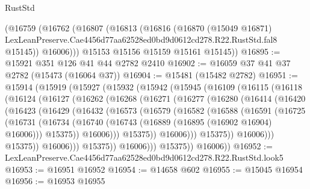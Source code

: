 \begin{lexlean}{RustStd}
\begin{coremodule}
      (@16759
        (@16762
          (@16807
            (@16813
              (@16816
                (@16870
                  (@15049 @16871)
                  LexLeanPreserve.Cae4456d77aa62528ed0bd9d0612cd278.R22.RustStd.fal8
                  @15145))
              @16006)))
        @15153
        @15156
        @15159
        @15161
        @15145))
@16895 := @15921 @351 @126 @41 @44 @2782 @2410
@16902 := @16059 @37 @41 @37 @2782 (@15473 (@16064 @37))
@16904 := @15481 (@15482 @2782)
@16951 := @15914
    (@15919
      (@15927
        (@15932
          (@15942
            (@15945
              (@16109
                (@16115
                  (@16118
                    (@16124
                      (@16127
                        (@16262
                          (@16268
                            (@16271
                              (@16277
                                (@16280
                                  (@16414
                                    (@16420
                                      (@16423
                                        (@16429
                                          (@16432
                                            (@16573
                                              (@16579
                                                (@16582
                                                  (@16588
                                                    (@16591
                                                      (@16725
                                                        (@16731
                                                          (@16734
                                                            (@16740
                                                              (@16743
                                                                (@16889
                                                                  (@16895 (@16902 @16904) @16006)))
                                                              @15375))
                                                          @16006)))
                                                    @15375))
                                                @16006)))
                                          @15375))
                                      @16006)))
                                @15375))
                            @16006)))
                      @15375))
                  @16006)))
            @15375))
        @16006))
@16952 := LexLeanPreserve.Cae4456d77aa62528ed0bd9d0612cd278.R22.RustStd.look5
@16953 := @16951 @16952
@16954 := @14658 @602
@16955 := @15045 @16954
@16956 := @16953 @16955

\end{coremodule}
\end{lexlean}
